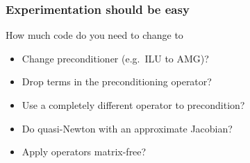 \documentclass[presentation]{beamer}
\begin{document}
\begin{frame}
  \frametitle{Experimentation should be easy}
  How much code do you need to change to
  \begin{itemize}
  \item Change preconditioner (e.g.~ILU to AMG)?
  \item Drop terms in the preconditioning operator?
  \item Use a completely different operator to precondition?
  \item Do quasi-Newton with an approximate Jacobian?
  \item Apply operators matrix-free?
  \end{itemize}
\end{frame}


\begin{frame}[standout]
\end{frame}
\end{document}
